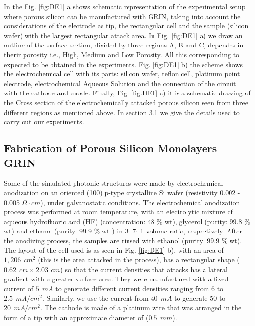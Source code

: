 \documentclass{article}
\begin{document}
In the Fig. \ref{fig:DE1} a shows schematic representation of the
experimental setup where porous silicon can be manufactured with GRIN,
taking into account the considerations of the electrode as tip, the
rectangular cell and the sample (silicon wafer) with the largest
rectangular attack area.
In Fig. \ref{fig:DE1} a) we draw an outline of the surface section,
divided by three regions A, B and C, dependes in therir porosity i.e.,
High, Medium and Low Porosity. All this corresponding to  expected to
be obtained in the experiments. Fig. \ref{fig:DE1} b) the scheme shows
the electrochemical cell with its parts: silicon wafer, teflon cell,
platinum point electrode, electrochemical Aqueous Solution and the
connection of the circuit with the cathode and anode. Finally,
Fig. \ref{fig:DE1} c) it is a schematic drawing of the Cross section
of the electrochemically attacked porous silicon seen from three
different regions as mentioned above. In section 3.1 we give the
details used to carry out our experiments.

\subsection{Fabrication of Porous Silicon Monolayers GRIN}
Some of the simulated photonic structures were made by electrochemical
anodization on an oriented (100) p-type crystalline Si wafer
(resistivity 0.002 - 0.005 $ \Omega \cdot cm $), under galvanostatic
conditions. The electrochemical anodization process was performed at
room temperature, with an electrolytic mixture of aqueous hydrofluoric
acid (HF) (concentration: 48 $ \% $ wt), glycerol (purity: 99.8 $ \% $
wt) and ethanol (purity: 99.9 $ \%$ wt ) in 3: 7: 1 volume ratio,
respectively. After the anodizing process, the samples are rinsed with
ethanol (purity: 99.9 $ \% $  wt). The layout of the cell used is as
seen in Fig. \ref{fig:DE1} b), with an area of $ 1,206 \ \ cm^2 $
(this is the area attacked in the process), has a rectangular shape ($
0.62 \ \ cm \times 2.03 \ \ cm $)  so that the current densities  that
attacks has a lateral gradient with a greater surface area. They were
manufactured with a fixed current of $ 5 \ \ mA $ to generate
different current densities ranging from $ 6  $ to $ 2.5 \ \ mA / cm^2
$. Similarly, we use the current from $ 40 \ \ mA $ to generate $ 50 $
to $ 20 \ \ mA / cm ^ 2 $. The cathode is made of a platinum wire that
was arranged in the form of a tip with an approximate diameter of ($
0.5 \ \ mm $).
\end{document}
